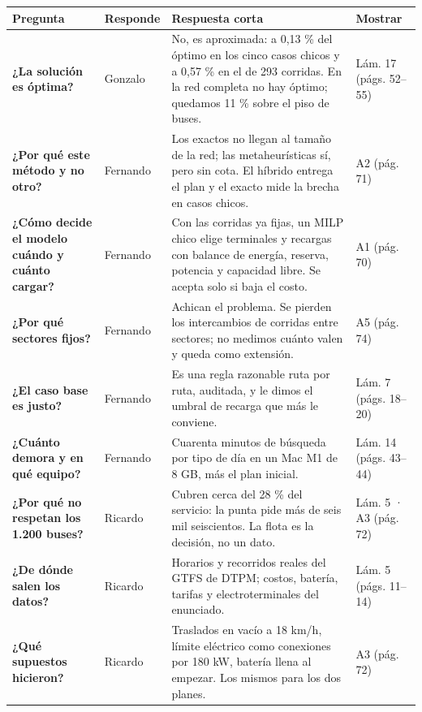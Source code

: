 \documentclass[12pt]{article}
\begin{document}
{\small
\begin{longtable}{@{}>{\raggedright\arraybackslash}p{3.5cm} >{\raggedright\arraybackslash}p{1.95cm} >{\raggedright\arraybackslash}p{7.45cm} >{\raggedright\arraybackslash}p{2.5cm}@{}}
\toprule
\textbf{Pregunta} & \textbf{Responde} & \textbf{Respuesta corta} & \textbf{Mostrar} \\ \midrule
\endhead
\textbf{¿La solución es óptima?} & Gonzalo & No, es aproximada: a 0,13 \% del óptimo en los cinco casos chicos y a 0,57 \% en el de 293 corridas. En la red completa no hay óptimo; quedamos 11 \% sobre el piso de buses. & {\small Lám. 17 (págs. 52–55)} \\ \midrule
\textbf{¿Por qué este método y no otro?} & Fernando & Los exactos no llegan al tamaño de la red; las metaheurísticas sí, pero sin cota. El híbrido entrega el plan y el exacto mide la brecha en casos chicos. & {\small A2 (pág. 71)} \\ \midrule
\textbf{¿Cómo decide el modelo cuándo y cuánto cargar?} & Fernando & Con las corridas ya fijas, un MILP chico elige terminales y recargas con balance de energía, reserva, potencia y capacidad libre. Se acepta solo si baja el costo. & {\small A1 (pág. 70)} \\ \midrule
\textbf{¿Por qué sectores fijos?} & Fernando & Achican el problema. Se pierden los intercambios de corridas entre sectores; no medimos cuánto valen y queda como extensión. & {\small A5 (pág. 74)} \\ \midrule
\textbf{¿El caso base es justo?} & Fernando & Es una regla razonable ruta por ruta, auditada, y le dimos el umbral de recarga que más le conviene. & {\small Lám. 7 (págs. 18–20)} \\ \midrule
\textbf{¿Cuánto demora y en qué equipo?} & Fernando & Cuarenta minutos de búsqueda por tipo de día en un Mac M1 de 8 GB, más el plan inicial. & {\small Lám. 14 (págs. 43–44)} \\ \midrule
\textbf{¿Por qué no respetan los 1.200 buses?} & Ricardo & Cubren cerca del 28 \% del servicio: la punta pide más de seis mil seiscientos. La flota es la decisión, no un dato. & {\small Lám. 5 · A3 (pág. 72)} \\ \midrule
\textbf{¿De dónde salen los datos?} & Ricardo & Horarios y recorridos reales del GTFS de DTPM; costos, batería, tarifas y electroterminales del enunciado. & {\small Lám. 5 (págs. 11–14)} \\ \midrule
\textbf{¿Qué supuestos hicieron?} & Ricardo & Traslados en vacío a 18 km/h, límite eléctrico como conexiones por 180 kW, batería llena al empezar. Los mismos para los dos planes. & {\small A3 (pág. 72)} \\ \midrule

\end{longtable}}
\end{document}
